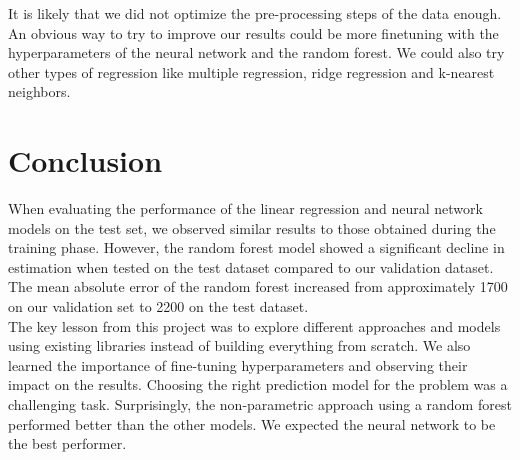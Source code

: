 \documentclass[a4, 10 pt, conference]{ieeeconf}  %
\begin{document}
It is likely that we did not optimize the pre-processing steps of the data enough.
An obvious way to try to improve our results could be more finetuning with the hyperparameters of the neural network and the random forest. 
We could also try other types of regression like multiple regression, ridge regression and k-nearest neighbors.
\section{Conclusion}
\label{sec:con}

When evaluating the performance of the linear regression and neural network models on the test set, we observed similar results to those obtained during the training phase. However, the random forest model showed a significant decline in estimation when tested on the test dataset compared to our validation dataset. The mean absolute error of the random forest increased from approximately 1700 on our validation set to 2200 on the test dataset.\\
The key lesson from this project was to explore different approaches and models using existing libraries instead of building everything from scratch. We also learned the importance of fine-tuning hyperparameters and observing their impact on the results.
Choosing the right prediction model for the problem was a challenging task. Surprisingly, the non-parametric approach using a random forest performed better than the other models. We expected the neural network to be the best performer.



\end{document}
